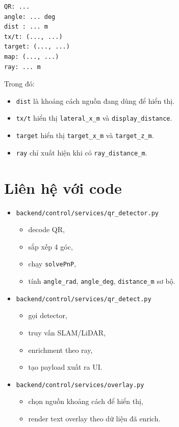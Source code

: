 \documentclass[12pt,a4paper]{article}
\begin{document}
\begin{verbatim}
QR: ...
angle: ... deg
dist : ... m
tx/t: (..., ...)
target: (..., ...)
map: (..., ...)
ray: ... m
\end{verbatim}

Trong đó:

\begin{itemize}
    \item \texttt{dist} là khoảng cách nguồn đang dùng để hiển thị.
    \item \texttt{tx/t} hiển thị \texttt{lateral\_x\_m} và \texttt{display\_distance}.
    \item \texttt{target} hiển thị \texttt{target\_x\_m} và \texttt{target\_z\_m}.
    \item \texttt{ray} chỉ xuất hiện khi có \texttt{ray\_distance\_m}.
\end{itemize}

\section{Liên hệ với code}

\begin{itemize}
    \item \texttt{backend/control/services/qr\_detector.py}
    \begin{itemize}
        \item decode QR,
        \item sắp xếp 4 góc,
        \item chạy \texttt{solvePnP},
        \item tính \texttt{angle\_rad}, \texttt{angle\_deg}, \texttt{distance\_m} sơ bộ.
    \end{itemize}
    \item \texttt{backend/control/services/qr\_detect.py}
    \begin{itemize}
        \item gọi detector,
        \item truy vấn SLAM/LiDAR,
        \item enrichment theo ray,
        \item tạo payload xuất ra UI.
    \end{itemize}
    \item \texttt{backend/control/services/overlay.py}
    \begin{itemize}
        \item chọn nguồn khoảng cách để hiển thị,
        \item render text overlay theo dữ liệu đã enrich.
    \end{itemize}
\end{itemize}
\end{document}
